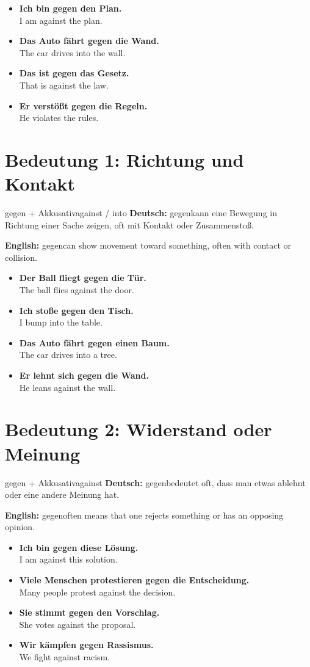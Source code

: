 \documentclass[a4paper,11pt]{article}
\newcommand{\GermanText}[1]{\textbf{Deutsch: }#1\par}
\newcommand{\EnglishText}[1]{{\small\color{SoftGray}\textbf{English: }#1\par}}
\newcommand{\ExampleItem}[2]{\item \textbf{#1}\\{\small\color{SoftGray}#2}}
\begin{document}
\begin{exbox}
\begin{itemize}
    \ExampleItem{Ich bin gegen den Plan.}{I am against the plan.}
    \ExampleItem{Das Auto fährt gegen die Wand.}{The car drives into the wall.}
    \ExampleItem{Das ist gegen das Gesetz.}{That is against the law.}
    \ExampleItem{Er verstößt gegen die Regeln.}{He violates the rules.}
\end{itemize}
\end{exbox}

\section{Bedeutung 1: Richtung und Kontakt}

\begin{grammarentry}{gegen + Akkusativ}{against / into}
\GermanText{\glqq gegen\grqq kann eine Bewegung in Richtung einer Sache zeigen, oft mit Kontakt oder Zusammenstoß.}
\EnglishText{\glqq gegen\grqq can show movement toward something, often with contact or collision.}
\end{grammarentry}

\begin{exbox}
\begin{itemize}
    \ExampleItem{Der Ball fliegt gegen die Tür.}{The ball flies against the door.}
    \ExampleItem{Ich stoße gegen den Tisch.}{I bump into the table.}
    \ExampleItem{Das Auto fährt gegen einen Baum.}{The car drives into a tree.}
    \ExampleItem{Er lehnt sich gegen die Wand.}{He leans against the wall.}
\end{itemize}
\end{exbox}

\section{Bedeutung 2: Widerstand oder Meinung}

\begin{grammarentry}{gegen + Akkusativ}{against}
\GermanText{\glqq gegen\grqq bedeutet oft, dass man etwas ablehnt oder eine andere Meinung hat.}
\EnglishText{\glqq gegen\grqq often means that one rejects something or has an opposing opinion.}
\end{grammarentry}

\begin{exbox}
\begin{itemize}
    \ExampleItem{Ich bin gegen diese Lösung.}{I am against this solution.}
    \ExampleItem{Viele Menschen protestieren gegen die Entscheidung.}{Many people protest against the decision.}
    \ExampleItem{Sie stimmt gegen den Vorschlag.}{She votes against the proposal.}
    \ExampleItem{Wir kämpfen gegen Rassismus.}{We fight against racism.}
\end{itemize}
\end{exbox}
\end{document}
